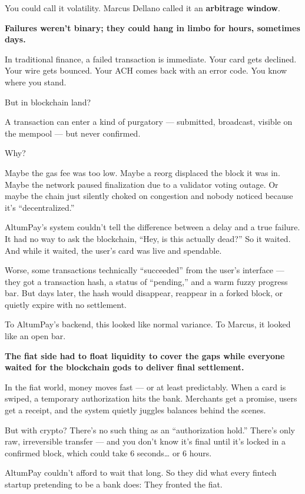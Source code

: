 You could call it volatility.  
Marcus Dellano called it an \textbf{arbitrage window}.


\textbf{Failures weren’t binary; they could hang in limbo for hours, sometimes days.}

In traditional finance, a failed transaction is immediate.  
Your card gets declined. Your wire gets bounced. Your ACH comes back with an error code.  
You know where you stand.

But in blockchain land?

A transaction can enter a kind of purgatory —  
submitted, broadcast, visible on the mempool — but never confirmed.

Why?

Maybe the gas fee was too low.  
Maybe a reorg displaced the block it was in.  
Maybe the network paused finalization due to a validator voting outage.  
Or maybe the chain just silently choked on congestion and nobody noticed because it’s “decentralized.”

AltumPay’s system couldn’t tell the difference between a delay and a true failure.  
It had no way to ask the blockchain, “Hey, is this actually dead?”  
So it waited.  
And while it waited, the user's card was live and spendable.

Worse, some transactions technically “succeeded” from the user's interface —  
they got a transaction hash, a status of “pending,” and a warm fuzzy progress bar.  
But days later, the hash would disappear, reappear in a forked block, or quietly expire with no settlement.

To AltumPay’s backend, this looked like normal variance.  
To Marcus, it looked like an open bar.


\textbf{The fiat side had to float liquidity to cover the gaps while everyone waited for the blockchain gods to deliver final settlement.}

In the fiat world, money moves fast — or at least predictably.  
When a card is swiped, a temporary authorization hits the bank.  
Merchants get a promise, users get a receipt, and the system quietly juggles balances behind the scenes.

But with crypto?  
There’s no such thing as an “authorization hold.”  
There’s only raw, irreversible transfer — and you don’t know it’s final until it’s locked in a confirmed block, which could take 6 seconds… or 6 hours.

AltumPay couldn’t afford to wait that long.  
So they did what every fintech startup pretending to be a bank does:  
They fronted the fiat.

